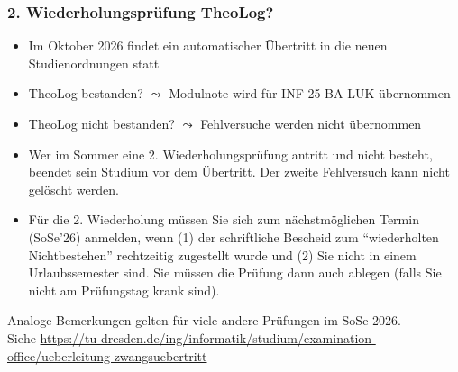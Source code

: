 \documentclass[aspectratio=1610,onlymath]{beamer}
\begin{document}
\begin{frame}\frametitle{2. Wiederholungsprüfung TheoLog?}

\begin{itemize}
\item Im Oktober 2026 findet ein automatischer Übertritt in die neuen Studienordnungen statt 
\item TheoLog bestanden? $\leadsto$ Modulnote wird für INF-25-BA-LUK übernommen
\item TheoLog nicht bestanden? $\leadsto$ Fehlversuche werden nicht übernommen
\item Wer im Sommer eine 2. Wiederholungsprüfung antritt und nicht besteht, beendet sein Studium vor dem Übertritt. Der zweite Fehlversuch kann nicht gelöscht werden.
\item Für die 2. Wiederholung müssen Sie sich zum nächstmöglichen Termin (SoSe'26) anmelden, wenn (1) der schriftliche Bescheid zum ``wiederholten Nichtbestehen'' rechtzeitig zugestellt wurde und (2) Sie nicht in einem Urlaubssemester sind. Sie müssen die Prüfung dann auch ablegen (falls Sie nicht am Prüfungstag krank sind).
\end{itemize}
\medskip

{\tiny Analoge Bemerkungen gelten für viele andere Prüfungen im SoSe 2026.\\ Siehe \url{https://tu-dresden.de/ing/informatik/studium/examination-office/ueberleitung-zwangsuebertritt}

}

\end{frame}


%
\end{document}

